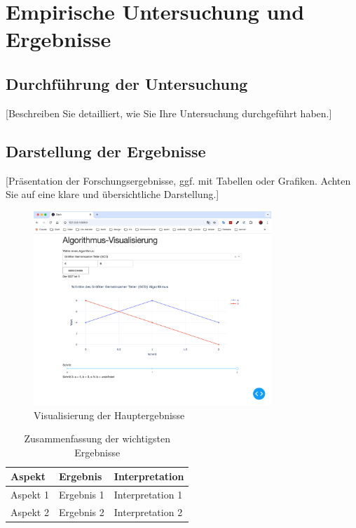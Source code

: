 \documentclass[12pt,a4paper,oneside]{article}
\begin{document}
\clearpage
\section{Empirische Untersuchung und Ergebnisse}
\subsection{Durchführung der Untersuchung}
[Beschreiben Sie detailliert, wie Sie Ihre Untersuchung durchgeführt haben.]

\subsection{Darstellung der Ergebnisse}
[Präsentation der Forschungsergebnisse, ggf. mit Tabellen oder Grafiken. Achten Sie auf eine klare und übersichtliche Darstellung.]

\begin{figure}[htbp]
    \centering
    \includegraphics[width=0.8\textwidth]{images/ergebnisse_grafik.png}
    \caption{Visualisierung der Hauptergebnisse}
    \label{fig:ergebnisse}
\end{figure}

\begin{table}[htbp]
    \centering
    \caption{Zusammenfassung der wichtigsten Ergebnisse}
    \label{tab:ergebnisse}
    \begin{tabularx}{\textwidth}{@{}lXX@{}}
    \toprule
    \textbf{Aspekt} & \textbf{Ergebnis} & \textbf{Interpretation} \\
    \midrule
    Aspekt 1 & Ergebnis 1 & Interpretation 1 \\
    Aspekt 2 & Ergebnis 2 & Interpretation 2 \\
    \bottomrule
    \end{tabularx}
\end{table}
\end{document}
